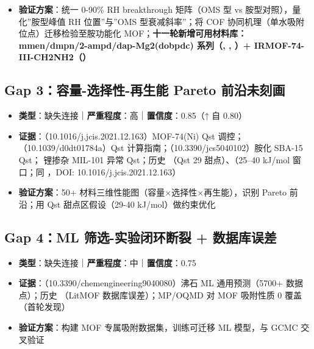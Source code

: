 \documentclass[12pt,a4paper]{ctexart}
\providecommand{\tightlist}{%
  \setlength{\itemsep}{0pt}\setlength{\parskip}{0pt}}
\begin{document}
\begin{itemize}
\begin{itemize}
  \item
    历史矛盾：\cite{p16}（水促进，原文待补 DOI）vs \cite{p129}（无影响）vs \cite{p139}（无竞争，原文待补 DOI）vs \cite{p128}（衰减）------\textbf{十一轮结论：矛盾可统一为 OMS 型（水占据 OMS→抑制）vs 胺型（水参与链形成→促进）二分，且有辫状链原子尺度机理支撑}
  \end{itemize}
\item
  \textbf{验证方案}：统一 0-90\% RH breakthrough 矩阵（OMS 型 vs 胺型对照），量化''胺型峰值 RH 位置''与''OMS 型衰减斜率''；将 COF 协同机理（单水吸附位点）迁移检验至胺功能化 MOF；\textbf{十一轮新增可用材料库：mmen/dmpn/2-ampd/dap-Mg2(dobpdc) 系列（\cite{r11s1_a7d3df468203}, \cite{r11s0_9932dacb5791}, \cite{r11s1_ff6147b117a5}）+ IRMOF-74-III-CH2NH2（\cite{r11s4_2c91341a5f47}）}
\end{itemize}

\subsection{Gap 3：容量-选择性-再生能 Pareto 前沿未刻画}\label{gap:gap-3ux5bb9ux91cf-ux9009ux62e9ux6027-ux518dux751fux80fd-pareto-ux524dux6cbfux672aux523bux753b}

\begin{itemize}
\tightlist
\item
  \textbf{类型}：缺失连接｜\textbf{严重程度}：高｜\textbf{置信度}：0.85（↑ 自 0.80）
\item
  \textbf{证据}：\cite{p27}（10.1016/j.jcis.2021.12.163）MOF-74(Ni) Qst 调控；\cite{p117}（10.1039/d0dt01784a）Qst 计算指南；\cite{p129}（10.3390/jcs5040102）胺化 SBA-15 Qst；\cite{p116} 锂掺杂 MIL-101 异常 Qst；历史 \cite{p27}（Qst 29 甜点）、\cite{p118}（25--40 kJ/mol 窗口；同 \cite{p27}，DOI: 10.1016/j.jcis.2021.12.163）
\item
  \textbf{验证方案}：50+ 材料三维性能图（容量×选择性×再生能），识别 Pareto 前沿；用 Qst 甜点区假设（29-40 kJ/mol）做约束优化
\end{itemize}

\subsection{Gap 4：ML 筛选-实验闭环断裂 + 数据库误差}\label{gap:gap-4ml-ux7b5bux9009-ux5b9eux9a8cux95edux73afux65adux88c2-ux6570ux636eux5e93ux8befux5dee}

\begin{itemize}
\tightlist
\item
  \textbf{类型}：缺失连接｜\textbf{严重程度}：中｜\textbf{置信度}：0.75
\item
  \textbf{证据}：\cite{p191}（10.3390/chemengineering9040080）沸石 ML 通用预测（5700+ 数据点）；历史 \cite{p17}（LitMOF 数据库误差）；MP/OQMD 对 MOF 吸附性质 0 覆盖（首轮发现）
\item
  \textbf{验证方案}：构建 MOF 专属吸附数据集，训练可迁移 ML 模型，与 GCMC 交叉验证
\end{itemize}
\end{document}

